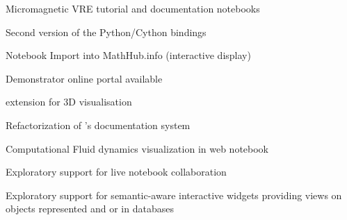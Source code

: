 \begin{workpackage}
\begin{wpdelivs}
    \begin{wpdeliv}[due=21,miles=proto1,id=oommf-nb-documentation,dissem=PU,nature=DEM,lead=USO]
      {Micromagnetic VRE tutorial and documentation notebooks}
    \end{wpdeliv}
  \begin{wpdeliv}[due=36,miles=proto1,id=pari-python-lib2,dissem=PU,nature=OTHER,lead=UB]
	  {Second version of the \Pari Python/Cython bindings}
  \end{wpdeliv}
    \begin{wpdeliv}[id=jupyter-import,due=24,miles=proto1,nature=DEM,dissem=PU,lead=JU]
      {Notebook Import into MathHub.info (interactive display)}
    \end{wpdeliv}
    \begin{wpdeliv}[due=24,id=oommf-nb-tmp,miles=proto1,dissem=PU,nature=DEC,lead=USO]
      {Demonstrator online portal available}
    \end{wpdeliv}
  \begin{wpdeliv}[due=24,id=vis3d,miles=proto1,dissem=PU,nature=OTHER,lead=SR]
      {\Jupyter extension for 3D visualisation}
  \end{wpdeliv}
  \begin{wpdeliv}[due=24,miles=proto1,id=sage-sphinx,dissem=PU,nature=OTHER,lead=PS]
      {Refactorization of \Sage's \Sphinx documentation system}
  \end{wpdeliv}
  \begin{wpdeliv}[due=36,miles=community,id=cfd-vis,dissem=PU,nature=OTHER,lead=SR]
      {Computational Fluid dynamics visualization in web notebook}
  \end{wpdeliv}
  \begin{wpdeliv}[due=36,miles=community,id=jupyter-live-collab,dissem=PU,nature=OTHER,lead=SR]
      {Exploratory support for live notebook collaboration}
  \end{wpdeliv}
  \begin{wpdeliv}[due=36,id=ipython-advanced-interacts,dissem=PU,nature=DEM,lead=PS]
      {Exploratory support for semantic-aware interactive widgets providing views on objects
      represented and or in databases}
  \end{wpdeliv}



\end{wpdelivs}
\end{workpackage}
